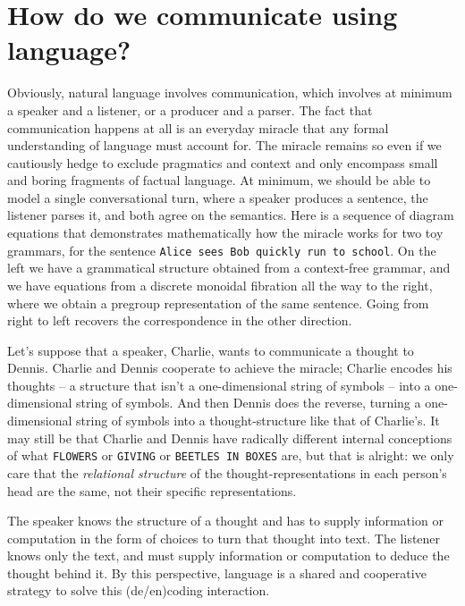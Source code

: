 \section{How do we communicate using language?}

 Obviously, natural language involves communication, which involves at minimum a speaker and a listener, or a producer and a parser. The fact that communication happens at all is an everyday miracle that any formal understanding of language must account for. The miracle remains so even if we cautiously hedge to exclude pragmatics and context and only encompass small and boring fragments of factual language. At minimum, we should be able to model a single conversational turn, where a speaker produces a sentence, the listener parses it, and both agree on the semantics. Here is a sequence of diagram equations that demonstrates mathematically how the miracle works for two toy grammars, for the sentence \texttt{Alice sees Bob quickly run to school}. On the left we have a grammatical structure obtained from a context-free grammar, and we have equations from a discrete monoidal fibration all the way to the right, where we obtain a pregroup representation of the same sentence. Going from right to left recovers the correspondence in the other direction.

 Let's suppose that a speaker, Charlie, wants to communicate a thought to Dennis. Charlie and Dennis cooperate to achieve the miracle; Charlie encodes his thoughts -- a structure that isn't a one-dimensional string of symbols -- into a one-dimensional string of symbols. And then Dennis does the reverse, turning a one-dimensional string of symbols into a thought-structure like that of Charlie's. It may still be that Charlie and Dennis have radically different internal conceptions of what \texttt{FLOWERS} or \texttt{GIVING} or \texttt{BEETLES IN BOXES} are, but that is alright: we only care that the \emph{relational structure} of the thought-representations in each person's head are the same, not their specific representations.

 The speaker knows the structure of a thought and has to supply information or computation in the form of choices to turn that thought into text. The listener knows only the text, and must supply information or computation to deduce the thought behind it. By this perspective, language is a shared and cooperative strategy to solve this (de/en)coding interaction.

